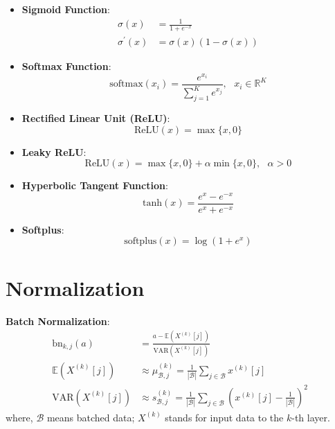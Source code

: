 \documentclass[a4paper]{article}
\begin{document}
\begin{itemize}
	\item \textbf{Sigmoid Function}:
	\begin{align}
		\sigma (x) &= \frac{1}{1 + e^{-x}} \\
		\sigma^{\prime} (x) &= \sigma (x) (1 - \sigma(x))
	\end{align}
	\item \textbf{Softmax Function}: 
	\begin{equation}
		\text{softmax} (x_i) = \frac{e^{x_i}}{\sum_{j=1}^{K} e^{x_j}},\,\,\,\, x_i \in \mathbb{R}^K
	\end{equation}
	\item \textbf{Rectified Linear Unit (ReLU)}:
	\begin{equation}
		\text{ReLU} (x) = \max \{ x, 0 \}
	\end{equation}
	\item \textbf{Leaky ReLU}:
	\begin{equation}
		\text{ReLU} (x) = \max \{ x, 0 \} + \alpha \min \{ x, 0 \},\,\,\,\, \alpha > 0
	\end{equation}
	\item \textbf{Hyperbolic Tangent Function}:
	\begin{equation}
		\text{tanh} (x) = \frac{e^x - e^{-x}}{e^x + e^{-x}}
	\end{equation}
	\item \textbf{Softplus}:
	\begin{equation}
		\text{softplus} (x) = \log (1 + e^x)
	\end{equation}
\end{itemize}

\section{Normalization}  

\textbf{Batch Normalization}: 
\begin{align}
	\text{bn}_{k, j} (a) &= \frac{a - \mathbb{E} (X^{(k)}[j])}{\text{VAR} (X^{(k)}[j])} \\
	\mathbb{E} (X^{(k)}[j]) &\approx \mu_{\mathcal{B}, j}^{(k)} = \frac{1}{|\mathcal{B}|} \sum_{j \in \mathcal{B}} x^{(k)}[j] \\
	\text{VAR} (X^{(k)}[j]) &\approx s_{\mathcal{B}, j}^{(k)} = \frac{1}{|\mathcal{B}|} \sum_{j \in \mathcal{B}} (x^{(k)}[j] - \frac{1}{|\mathcal{B}|})^2
\end{align}
where, $\mathcal{B}$ means batched data; $X^{(k)}$ stands for input data to the $k$-th layer.
\end{document}
